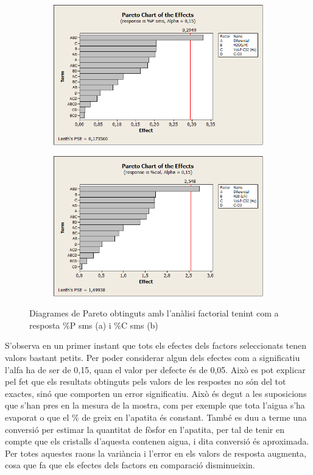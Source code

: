 \documentclass[a4paper]{article}
\begin{document}
\begin{figure}[H]
	\begin{subfigure}{.5\textwidth}
		\centering
		\includegraphics[width=.9\linewidth]{images/Pareto15P}
		\caption{}
		\label{fig:Pareto15P}
	\end{subfigure}%
	\begin{subfigure}{.5\textwidth}
		\centering
		\includegraphics[width=.9\linewidth]{images/Pareto15col}
		\caption{}
		\label{fig:Pareto15C}
	\end{subfigure}
	\caption{Diagrames de Pareto obtinguts amb l’anàlisi factorial tenint com a resposta \%P sms (a) i \%C sms (b)}
	\label{fig:Pareto15}
\end{figure}

S’observa en un primer instant que tots els efectes dels factors seleccionats tenen valors bastant petits. Per poder considerar algun dels efectes com a significatiu l’alfa ha de ser de 0,15, quan el valor per defecte és de 0,05. Això es pot explicar pel fet que els resultats obtinguts pels valors de les respostes no són del tot exactes, sinó que comporten un error significatiu. Això és degut a les suposicions que s’han pres en la mesura de la mostra, com per exemple que tota l’aigua s’ha evaporat o que el \% de greix en l’apatita és constant. També es duu a terme una conversió per estimar la quantitat de fòsfor en l’apatita, per tal de tenir en compte que els cristalls d’aquesta contenen aigua, i dita conversió és aproximada. Per totes aquestes raons la variància i l’error en els valors de resposta augmenta, cosa que fa que els efectes dels factors en comparació disminueixin.
\end{document}

